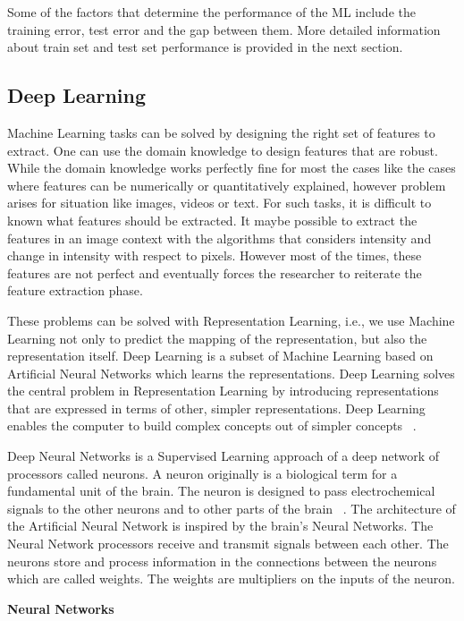 Some of the factors that determine the performance of the ML include the training error, test error and the gap between them. More detailed information about train set and test set performance is provided in the next section.

\subsection{Deep Learning}
Machine Learning tasks can be solved by designing the right set of features to extract. One can use the domain knowledge to design features that are robust. While the domain knowledge works perfectly fine for most the cases like the cases where features can be numerically or quantitatively explained, however problem arises for situation like images, videos or text. For such tasks, it is difficult to known what features should be extracted. It maybe possible to extract the features in an image context with the algorithms that considers intensity and change in intensity with respect to pixels. However most of the times, these features are not perfect and eventually forces the researcher to reiterate the feature extraction phase.

These problems can be solved with Representation Learning, i.e., we use Machine Learning not only to predict the mapping of the representation, but also the representation itself. Deep Learning is a subset of Machine Learning based on Artificial Neural Networks which learns the representations.
Deep Learning solves the central problem in Representation Learning by introducing representations that are expressed in terms of other, simpler representations. Deep Learning enables the computer to build complex concepts out of simpler concepts ~\cite{Goodfellow-et-al-2016}.  

Deep Neural Networks is a Supervised Learning approach of a deep network of processors called neurons.
A neuron originally is a biological term for a fundamental unit of the brain. The
neuron is designed to pass electrochemical signals to the other neurons and to other parts
of the brain ~\cite{Goodfellow-et-al-2016}. The architecture of the Artificial Neural Network is inspired by the brain's Neural Networks.
The Neural Network processors receive and transmit signals between each other. The
neurons store and process information in the connections between the neurons which are
called weights. The weights are multipliers on the inputs of the neuron.
\newline

\noindent \textbf{Neural Networks}
\newline

